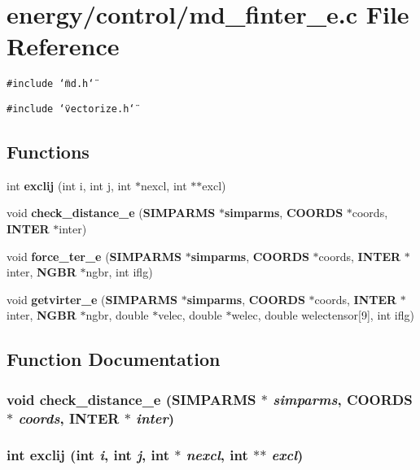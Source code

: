 \section{energy/control/md\_\-finter\_\-e.c File Reference}
\label{md__finter__e_8c}
{\tt \#include \char`\"{}md.h\char`\"{}}\par
{\tt \#include \char`\"{}vectorize.h\char`\"{}}\par
\subsection*{Functions}
\begin{CompactItemize}
\item 
int {\bf exclij} (int i, int j, int $\ast$nexcl, int $\ast$$\ast$excl)
\item 
void {\bf check\_\-distance\_\-e} ({\bf SIMPARMS} $\ast${\bf simparms}, {\bf COORDS} $\ast$coords, {\bf INTER} $\ast$inter)
\item 
void {\bf force\_\-ter\_\-e} ({\bf SIMPARMS} $\ast${\bf simparms}, {\bf COORDS} $\ast$coords, {\bf INTER} $\ast$inter, {\bf NGBR} $\ast$ngbr, int iflg)
\item 
void {\bf getvirter\_\-e} ({\bf SIMPARMS} $\ast${\bf simparms}, {\bf COORDS} $\ast$coords, {\bf INTER} $\ast$inter, {\bf NGBR} $\ast$ngbr, double $\ast$velec, double $\ast$welec, double welectensor[9], int iflg)
\end{CompactItemize}


\subsection{Function Documentation}
\subsubsection{\setlength{\rightskip}{0pt plus 5cm}void check\_\-distance\_\-e ({\bf SIMPARMS} $\ast$ {\em simparms}, {\bf COORDS} $\ast$ {\em coords}, {\bf INTER} $\ast$ {\em inter})}\label{md__finter__e_8c_ccf631c55850db334f9fbefb3d7d9828}


\subsubsection{\setlength{\rightskip}{0pt plus 5cm}int exclij (int {\em i}, int {\em j}, int $\ast$ {\em nexcl}, int $\ast$$\ast$ {\em excl})}\label{md__finter__e_8c_ce91782432810b76fa5e579bdf4d23f0}


